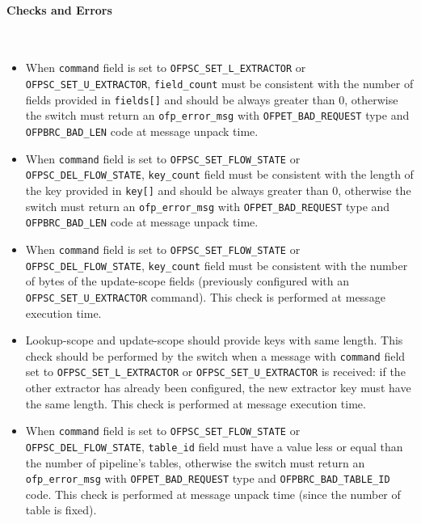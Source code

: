 \paragraph{Checks and Errors}\mbox{}\\
\begin{itemize}
    \item When \texttt{command} field is set to \texttt{OFPSC\_SET\_L\_EXTRACTOR} or \texttt{OFPSC\_SET\_U\_EXTRACTOR}, \texttt{field\_count} must be consistent with the number of fields provided in \texttt{fields[]} and should be always greater than 0, otherwise the switch must return an \texttt{ofp\_error\_msg} with \texttt{OFPET\_BAD\_REQUEST} type and \texttt{OFPBRC\_BAD\_LEN} code at message unpack time.

    \item When \texttt{command} field is set to \texttt{OFPSC\_SET\_FLOW\_STATE} or \texttt{OFPSC\_DEL\_FLOW\_STATE}, \texttt{key\_count} field must be consistent with the length of the key provided in \texttt{key[]} and should be always greater than 0, otherwise the switch must return an \texttt{ofp\_error\_msg} with \texttt{OFPET\_BAD\_REQUEST} type and \texttt{OFPBRC\_BAD\_LEN} code at message unpack time.

    \item When \texttt{command} field is set to \texttt{OFPSC\_SET\_FLOW\_STATE} or \texttt{OFPSC\_DEL\_FLOW\_STATE}, \texttt{key\_count} field must be consistent with the number of bytes of the update-scope fields (previously configured with an \texttt{OFPSC\_SET\_U\_EXTRACTOR} command). This check is performed at message execution time.

    \item Lookup-scope and update-scope should provide keys with same length. This check should be performed by the switch when a message with \texttt{command} field set to \texttt{OFPSC\_SET\_L\_EXTRACTOR} or \texttt{OFPSC\_SET\_U\_EXTRACTOR} is received: if the other extractor has already been configured, the new extractor key must have the same length. This check is performed at message execution time.

    \item When \texttt{command} field is set to \texttt{OFPSC\_SET\_FLOW\_STATE} or \texttt{OFPSC\_DEL\_FLOW\_STATE}, \texttt{table\_id} field must have a value less or equal than the number of pipeline’s tables, otherwise the switch must return an \texttt{ofp\_error\_msg} with \texttt{OFPET\_BAD\_REQUEST} type and \texttt{OFPBRC\_BAD\_TABLE\_ID} code. This check is performed at message unpack time (since the number of table is fixed).
\end{itemize}

